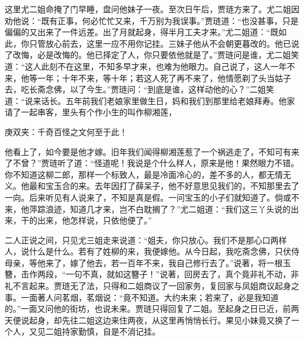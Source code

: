 \begin{parag}
    这里尤二姐命掩了门早睡，盘问他妹子一夜。至次日午后，贾琏方来了。尤二姐因劝他说：“既有正事，何必忙忙又来，千万别为我误事。”贾琏道：“也没甚事，只是偏偏的又出来了一件远差。出了月就起身，得半月工夫才来。”尤二姐道：“既如此，你只管放心前去，这里一应不用你记挂。三妹子他从不会朝更暮改的。他已说了改悔，必是改悔的。他已择定了人，你只要依他就是了。”贾琏问是谁，尤二姐笑道：“这人此刻不在这里，不知多早才来，也难为他眼力。自己说了，这人一年不来，他等一年；十年不来，等十年；若这人死了再不来了，他情愿剃了头当姑子去，吃长斋念佛，以了今生。”贾琏问：“到底是谁，这样动他的心？”二姐笑道：“说来话长。五年前我们老娘家里做生日，妈和我们到那里给老娘拜寿。他家请了一起串客，里头有个作小生的叫作柳湘莲，\begin{note}庚双夹：千奇百怪之文何至于此！\end{note}他看上了，如今要是他才嫁。旧年我们闻得柳湘莲惹了一个祸逃走了，不知可有来了不曾？”贾琏听了道：“怪道呢！我说是个什么样人，原来是他！果然眼力不错。你不知道这柳二郎，那样一个标致人，最是冷面冷心的，差不多的人，都无情无义。他最和宝玉合的来。去年因打了薛呆子，他不好意思见我们的，不知那里去了一向。后来听见有人说来了，不知是真是假。一问宝玉的小子们就知道了。倘或不来，他萍踪浪迹，知道几才来，岂不白耽搁了？”尤二姐道：“我们这三丫头说的出来，干的出来，他怎样说，只依他便了。”
\end{parag}


\begin{parag}
    二人正说之间，只见尤三姐走来说道：“姐夫，你只放心。我们不是那心口两样人，说什么是什么。若有了姓柳的来，我便嫁他。从今日起，我吃斋念佛，只伏侍母亲，等他来了，嫁了他去，若一百年不来，我自己修行去了。”说著，将一根玉簪，击作两段，“一句不真，就如这簪子！”说著，回房去了，真个竟非礼不动，非礼不言起来。贾琏无了法，只得和二姐商议了一回家务，复回家与凤姐商议起身之事。一面著人问茗烟，茗烟说：“竟不知道。大约未来；若来了，必是我知道的。”一面又问他的街坊，也说未来。贾琏只得回复了二姐。至起身之日已近，前两天便说起身，却先往二姐这边来住两夜，从这里再悄悄长行。果见小妹竟又换了一个人，又见二姐持家勤慎，自是不消记挂。
\end{parag}


